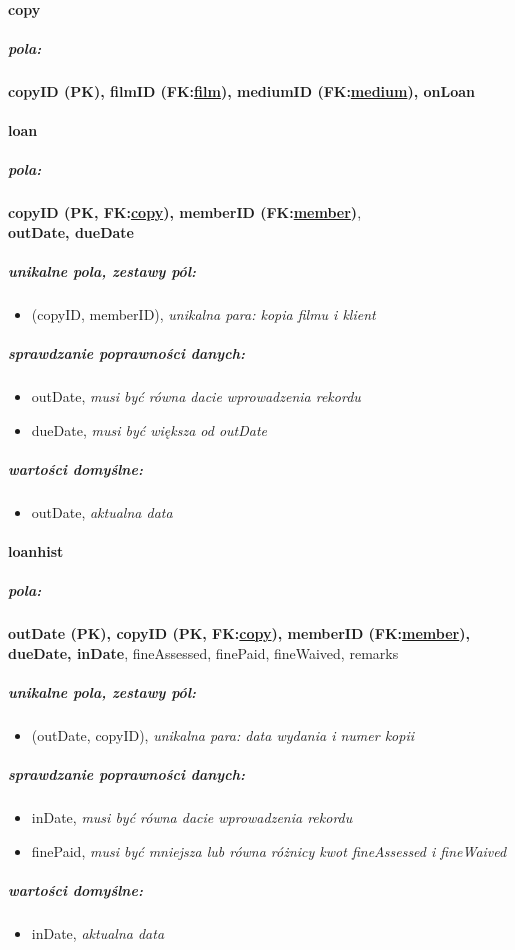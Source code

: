 \documentclass[12pt,a4paper,titlepage]{article}
\begin{document}
\paragraph{copy}
\subparagraph{pola:}
\textbf{copyID (PK), filmID (FK:\underline{film}), mediumID (FK:\underline{medium}), onLoan}

\paragraph{loan}
\subparagraph{pola:}
\textbf{copyID (PK, FK:\underline{copy}), memberID (FK:\underline{member})}, \\\textbf{outDate, dueDate}
\subparagraph{unikalne pola, zestawy pól:}
\begin{itemize}
	\item (copyID, memberID), \textit{unikalna para: kopia filmu i klient}
\end{itemize}
\subparagraph{sprawdzanie poprawności danych:}
\begin{itemize}
	\item outDate, \textit{musi być równa dacie wprowadzenia rekordu}
	\item dueDate, \textit{musi być większa od outDate}
\end{itemize}
\subparagraph{wartości domyślne:}
\begin{itemize}
	\item outDate, \textit{aktualna data}
\end{itemize}

\paragraph{loanhist}
\subparagraph{pola:}
\textbf{outDate (PK), copyID (PK, FK:\underline{copy}), memberID (FK:\underline{member}), dueDate, inDate}, fineAssessed, finePaid, fineWaived, remarks
\subparagraph{unikalne pola, zestawy pól:}
\begin{itemize}
	\item (outDate, copyID), \textit{unikalna para: data wydania i numer kopii}
\end{itemize}
\subparagraph{sprawdzanie poprawności danych:}
\begin{itemize}
	\item inDate, \textit{musi być równa dacie wprowadzenia rekordu}
	\item finePaid, \textit{musi być mniejsza lub równa różnicy kwot fineAssessed i fineWaived}
\end{itemize}
\subparagraph{wartości domyślne:}
\begin{itemize}
	\item inDate, \textit{aktualna data}
\end{itemize}
\end{document}

